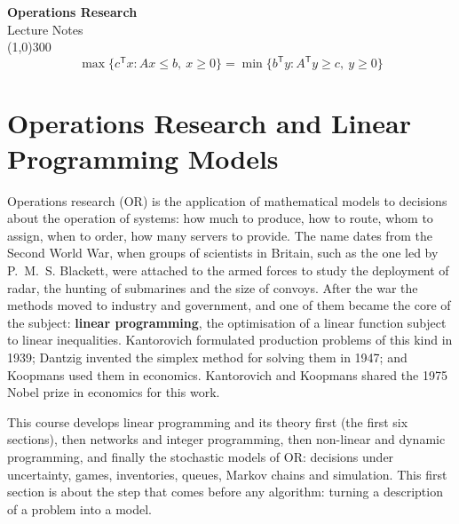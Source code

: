 \documentclass[11pt,a4paper]{article}
\numberwithin{equation}{section}
\theoremstyle{definition}
\begin{document}
\begin{titlepage}
\thispagestyle{empty}
\begin{center}
\vspace*{3cm}
{\Huge\bfseries Operations Research}\\[1.2cm]
{\large Lecture Notes}\\[2.5cm]
\line(1,0){300}\\[1.5cm]
$$\max\{c^{\mathsf T}x : Ax \le b,\ x \ge 0\} = \min\{b^{\mathsf T}y : A^{\mathsf T}y \ge c,\ y \ge 0\}$$
\end{center}
\end{titlepage}

\tableofcontents
\thispagestyle{empty}
\clearpage
\setcounter{page}{1}

\section{Operations Research and Linear Programming Models}
\label{sec:models}

Operations research (OR) is the application of mathematical models to decisions about the operation of systems: how much to produce, how to route, whom to assign, when to order, how many servers to provide. The name dates from the Second World War, when groups of scientists in Britain, such as the
one led by P.~M.~S. Blackett, were attached to the armed forces to study the deployment of radar, the hunting of submarines and the size of convoys. After the war the methods moved to industry and government, and one of them became the core of the subject: \textbf{linear programming}, the optimisation of a
linear function subject to linear inequalities. Kantorovich formulated production problems of this kind in 1939; Dantzig invented the simplex method for solving them in 1947; and Koopmans used them in economics. Kantorovich and Koopmans shared the 1975 Nobel prize in economics for this work.

This course develops linear programming and its theory first (the first six sections), then networks and integer programming, then non-linear and dynamic programming, and finally the stochastic models of OR: decisions under uncertainty, games, inventories, queues, Markov
chains and simulation. This first section is about the step that comes before any algorithm: turning a description of a problem into a model.
\end{document}
